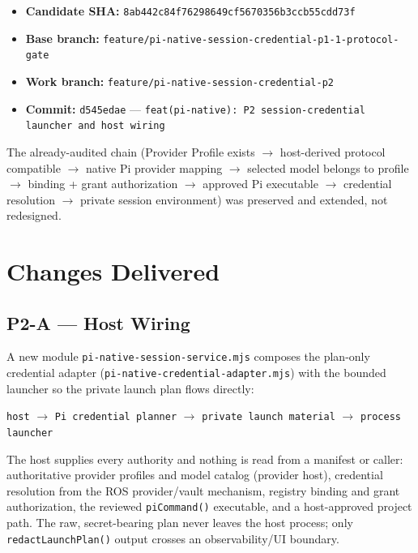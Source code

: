 \documentclass[11pt]{article}
\newcommand{\code}[1]{\texttt{#1}}
\begin{document}
\begin{itemize}
  \item \textbf{Candidate SHA:} \code{8ab442c84f76298649cf5670356b3ccb55cdd73f}
  \item \textbf{Base branch:} \code{feature/pi-native-session-credential-p1-1-protocol-gate}
  \item \textbf{Work branch:} \code{feature/pi-native-session-credential-p2}
  \item \textbf{Commit:} \code{d545edae} ---
    \code{feat(pi-native): P2 session-credential launcher and host wiring}
\end{itemize}

The already-audited chain (Provider Profile exists $\rightarrow$ host-derived
protocol compatible $\rightarrow$ native Pi provider mapping $\rightarrow$
selected model belongs to profile $\rightarrow$ binding + grant authorization
$\rightarrow$ approved Pi executable $\rightarrow$ credential resolution
$\rightarrow$ private session environment) was preserved and extended, not
redesigned.

\section{Changes Delivered}

\subsection{P2-A --- Host Wiring}

A new module \code{pi-native-session-service.mjs} composes the plan-only
credential adapter (\code{pi-native-credential-adapter.mjs}) with the bounded
launcher so the private launch plan flows directly:

\begin{center}
\code{host} $\rightarrow$ \code{Pi credential planner} $\rightarrow$
\code{private launch material} $\rightarrow$ \code{process launcher}
\end{center}

The host supplies every authority and nothing is read from a manifest or caller:
authoritative provider profiles and model catalog (provider host), credential
resolution from the ROS provider/vault mechanism, registry binding and grant
authorization, the reviewed \code{piCommand()} executable, and a host-approved
project path. The raw, secret-bearing plan never leaves the host process; only
\code{redactLaunchPlan()} output crosses an observability/UI boundary.
\end{document}
